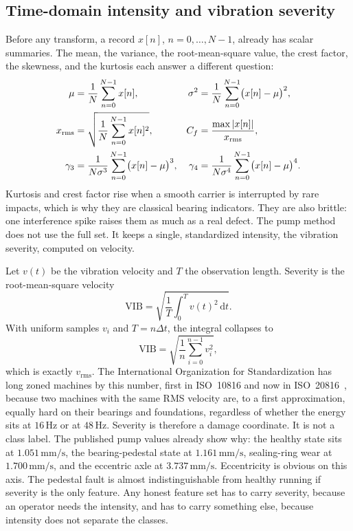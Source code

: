\subsection{Time-domain intensity and vibration severity}

Before any transform, a record \(x[n]\), \(n=0,\ldots,N-1\), already has scalar summaries.
The mean, the variance, the root-mean-square value, the crest factor, the skewness, and the kurtosis each answer a different question:
\begin{align}
\mu&=\frac{1}{N}\sum_{n=0}^{N-1}x[n],&
\sigma^{2}&=\frac{1}{N}\sum_{n=0}^{N-1}\bigl(x[n]-\mu\bigr)^{2},\\
x_{\mathrm{rms}}&=\sqrt{\frac{1}{N}\sum_{n=0}^{N-1}x[n]^{2}},&
C_{f}&=\frac{\max\left\lvert x[n] \right\rvert}{x_{\mathrm{rms}}},\\
\gamma_{3}&=\frac{1}{N\sigma^{3}}\sum_{n=0}^{N-1}\bigl(x[n]-\mu\bigr)^{3},&
\gamma_{4}&=\frac{1}{N\sigma^{4}}\sum_{n=0}^{N-1}\bigl(x[n]-\mu\bigr)^{4}.
\label{eq:timedomain}
\end{align}
Kurtosis and crest factor rise when a smooth carrier is interrupted by rare impacts, which is why they are classical bearing indicators.
They are also brittle: one interference spike raises them as much as a real defect.
The pump method does not use the full set.
It keeps a single, standardized intensity, the vibration severity, computed on velocity.

Let \(v(t)\) be the vibration velocity and \(T\) the observation length.
Severity is the root-mean-square velocity
\begin{equation}
\mathrm{VIB}=\sqrt{\frac{1}{T}\int_{0}^{T} v(t)^{2}\,\mathrm{d}t}.
\label{eq:vibcont}
\end{equation}
With uniform samples \(v_{i}\) and \(T=n\Delta t\), the integral collapses to
\begin{equation}
\mathrm{VIB}=\sqrt{\frac{1}{n}\sum_{i=0}^{n-1} v_{i}^{2}},
\label{eq:vibdisc}
\end{equation}
which is exactly \(v_{\mathrm{rms}}\).
The International Organization for Standardization has long zoned machines by this number, first in ISO~10816 and now in ISO~20816~\cite{iso10816,iso20816,iso13373}, because two machines with the same RMS velocity are, to a first approximation, equally hard on their bearings and foundations, regardless of whether the energy sits at \(16\,\mathrm{Hz}\) or at \(48\,\mathrm{Hz}\).
Severity is therefore a damage coordinate.
It is not a class label.
The published pump values already show why: the healthy state sits at \(1.051\,\mathrm{mm/s}\), the bearing-pedestal state at \(1.161\,\mathrm{mm/s}\), sealing-ring wear at \(1.700\,\mathrm{mm/s}\), and the eccentric axle at \(3.737\,\mathrm{mm/s}\).
Eccentricity is obvious on this axis.
The pedestal fault is almost indistinguishable from healthy running if severity is the only feature.
Any honest feature set has to carry severity, because an operator needs the intensity, and has to carry something else, because intensity does not separate the classes.

